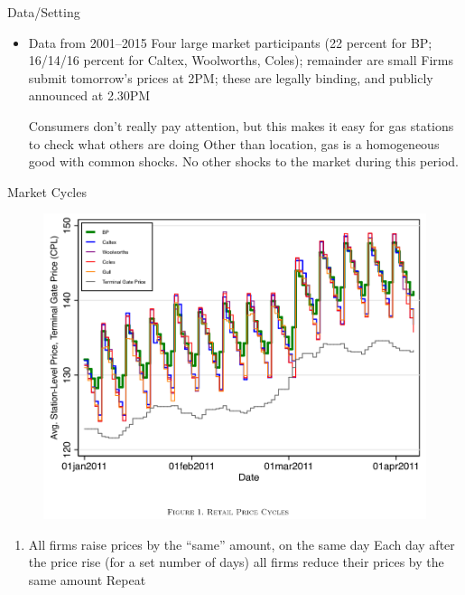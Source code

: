 \documentclass[dvipsnames]{beamer}
\begin{document}
  \begin{frame}{Data/Setting}
    \begin{itemize}
      \item Data from 2001--2015
    \vitem Four large market participants (22 percent for BP; 16/14/16 percent for Caltex, Woolworths, Coles); remainder are small
      \vitem Firms submit tomorrow's prices at 2PM; these are legally binding, and publicly announced at 2.30PM
      \begin{itemize}
      \vitem Consumers don't really pay attention, but this makes it easy for gas stations to check what others are doing
      \vitem Other than location, gas is a homogeneous good with common shocks.
      \vitem No other shocks to the market during this period.
      \end{itemize}
    \end{itemize}
  \end{frame}
  \begin{frame}{Market Cycles}
    \begin{figure}[htp]
      \centering
      \includegraphics[width=.6\textwidth, keepaspectratio=true]{fig1.png}
    \end{figure}
    \begin{enumerate}
    \item All firms raise prices by the ``same'' amount, on the same day
      \vitem Each day after the price rise (for a set number of days) all firms reduce their prices by the same amount
      \vitem Repeat
    \end{enumerate}
  \end{frame}
\end{document}
